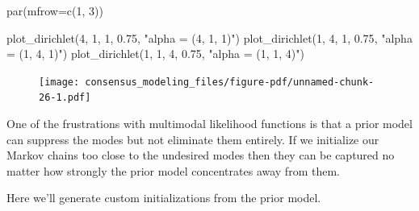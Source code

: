 \documentclass[
  letterpaper,
  DIV=11,
  numbers=noendperiod]{scrartcl}
\newenvironment{Shaded}{\begin{snugshade}}{\end{snugshade}}
\newcommand{\AttributeTok}[1]{\textcolor[rgb]{0.40,0.45,0.13}{#1}}
\newcommand{\DecValTok}[1]{\textcolor[rgb]{0.68,0.00,0.00}{#1}}
\newcommand{\FloatTok}[1]{\textcolor[rgb]{0.68,0.00,0.00}{#1}}
\newcommand{\FunctionTok}[1]{\textcolor[rgb]{0.28,0.35,0.67}{#1}}
\newcommand{\NormalTok}[1]{\textcolor[rgb]{0.00,0.23,0.31}{#1}}
\newcommand{\StringTok}[1]{\textcolor[rgb]{0.13,0.47,0.30}{#1}}
\begin{document}
\begin{Shaded}
\begin{Highlighting}[]
\FunctionTok{par}\NormalTok{(}\AttributeTok{mfrow=}\FunctionTok{c}\NormalTok{(}\DecValTok{1}\NormalTok{, }\DecValTok{3}\NormalTok{))}

\FunctionTok{plot\_dirichlet}\NormalTok{(}\DecValTok{4}\NormalTok{, }\DecValTok{1}\NormalTok{, }\DecValTok{1}\NormalTok{, }\FloatTok{0.75}\NormalTok{, }\StringTok{"alpha = (4, 1, 1)"}\NormalTok{)}
\FunctionTok{plot\_dirichlet}\NormalTok{(}\DecValTok{1}\NormalTok{, }\DecValTok{4}\NormalTok{, }\DecValTok{1}\NormalTok{, }\FloatTok{0.75}\NormalTok{, }\StringTok{"alpha = (1, 4, 1)"}\NormalTok{)}
\FunctionTok{plot\_dirichlet}\NormalTok{(}\DecValTok{1}\NormalTok{, }\DecValTok{1}\NormalTok{, }\DecValTok{4}\NormalTok{, }\FloatTok{0.75}\NormalTok{, }\StringTok{"alpha = (1, 1, 4)"}\NormalTok{)}
\end{Highlighting}
\end{Shaded}

\begin{figure}[H]

{\centering \texttt{[image: consensus\_modeling\_files/figure-pdf/unnamed-chunk-26-1.pdf]}

}

\end{figure}

One of the frustrations with multimodal likelihood functions is that a
prior model can suppress the modes but not eliminate them entirely. If
we initialize our Markov chains too close to the undesired modes then
they can be captured no matter how strongly the prior model concentrates
away from them.

Here we'll generate custom initializations from the prior model.
\end{document}
